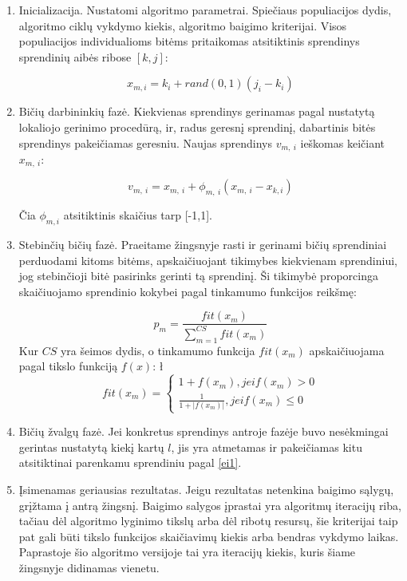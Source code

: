 \documentclass{VUMIFKompMagistrinis}
\begin{document}
\begin{enumerate}
    \item	Inicializacija. Nustatomi algoritmo parametrai. Spiečiaus populiacijos dydis, algoritmo ciklų vykdymo kiekis, algoritmo baigimo kriterijai. Visos populiacijos individualioms bitėms pritaikomas atsitiktinis sprendinys sprendinių aibės ribose $[k,j]$:

\begin{equation}\label{ei1}
x_{m,i}=k_{i}+rand(0,1)(j_{i}-k_{i})
\end{equation}


    \item 	Bičių darbininkių fazė. Kiekvienas sprendinys gerinamas pagal nustatytą lokaliojo gerinimo procedūrą, ir, radus geresnį sprendinį, dabartinis bitės sprendinys pakeičiamas geresniu. Naujas sprendinys $v_{m,\ i}$   ieškomas keičiant $x_{m,\ i}$:

\begin{equation}\label{eebp1}
v_{m,\ i}=x_{m,\ i} +\phi_{m,\ i} (x_{m,\ i} -x_{k,i} )
\end{equation}

Čia $\phi_{m,i}$ atsitiktinis skaičius tarp [-1,1].

    \item 	Stebinčių bičių fazė. Praeitame žingsnyje rasti ir gerinami bičių sprendiniai perduodami kitoms bitėms, apskaičiuojant tikimybes kiekvienam sprendiniui, jog stebinčioji bitė pasirinks gerinti tą sprendinį. Ši tikimybė proporcinga skaičiuojamo sprendinio kokybei pagal tinkamumo funkcijos reikšmę:

\begin{equation}
\label{eobp1}
p_m=\frac{fit(x_m)}{\sum_{m=1}^{CS}{fit(x_m)}}
\end{equation}
Kur $CS$ yra šeimos dydis, o tinkamumo funkcija $fit(x_m)$ apskaičiuojama pagal tikslo funkciją $f(x)$:
\l \begin{equation}\label{efit}
fit(x_m)=
\begin{cases}
1+f(x_m), jei f(x_m)>0\\
\frac{1}{1+|f(x_m)|}, jei f(x_m)\leq0
\end{cases}
\end{equation}


    \item 	Bičių žvalgų fazė. Jei konkretus sprendinys antroje fazėje buvo nesėkmingai gerintas nustatytą kiekį kartų $l$, jis yra atmetamas ir pakeičiamas kitu atsitiktinai parenkamu sprendiniu pagal \eqref{ei1}.

    \item 	Įsimenamas geriausias rezultatas. Jeigu rezultatas netenkina baigimo sąlygų, grįžtama į antrą žingsnį. Baigimo salygos įprastai yra algoritmų iteracijų riba, tačiau dėl algoritmo lyginimo tikslų arba dėl ribotų resursų, šie kriterijai taip pat gali būti tikslo funkcijos skaičiavimų kiekis arba bendras vykdymo laikas. Paprastoje šio algoritmo versijoje tai yra iteracijų kiekis, kuris šiame žingsnyje didinamas vienetu.

\end{enumerate}
\end{document}
